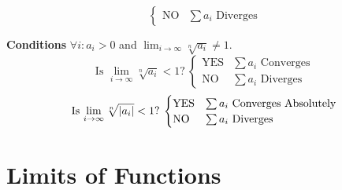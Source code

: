\documentclass{article}
\theoremstyle{plain}
\numberwithin{theorem}{subsection}
\theoremstyle{definition}
\numberwithin{definition}{subsection}
\theoremstyle{remark}
\numberwithin{note}{subsection}
\begin{document}
\begin{multicols}{2}
\begin{mdframed}[style=exampledefaultcols,frametitle={Ratio Test}]
\begin{equation*}
\begin{cases}
				\text{NO} & \text{$\sum a_i$ Diverges}
			\end{cases}
		\end{equation*}
	\end{mdframed}
	\begin{mdframed}[style=exampledefaultcols,frametitle={Root Test}]
		\textbf{Conditions} $\forall i:a_i>0$ and $\displaystyle \lim_{i\to\infty}\sqrt[n]{a_i}\neq 1$.
		\begin{equation*}
			\text{Is $\lim_{i\to\infty}\sqrt[n]{a_i} < 1$?}\:
			\begin{cases}
				\text{YES} & \text{$\sum a_i$ Converges} \\
				\text{NO} & \text{$\sum a_i$ Diverges}
			\end{cases}
		\end{equation*}
		\begin{equation*}
			\text{Is $\lim_{i\to\infty}\sqrt[n]{\abs{a_i}} < 1$?}\:
			\begin{cases}
				\text{YES} & \text{$\sum a_i$ Converges Absolutely} \\
				\text{NO} & \text{$\sum a_i$ Diverges}
			\end{cases}
		\end{equation*}
	\end{mdframed}
\end{multicols}
\pagebreak
%
\section{Limits of Functions}
\end{document}
